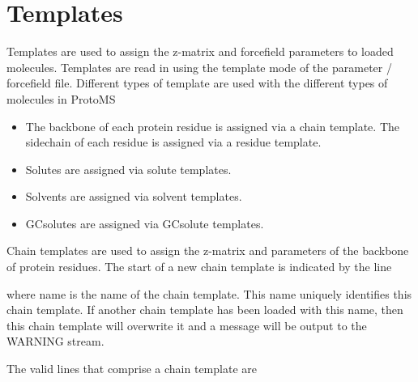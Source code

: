 \documentclass[letterpaper,10pt,english]{sphinxmanual}
\begin{document}
\section{Templates}
\label{\detokenize{protoms:templates}}\label{\detokenize{protoms:temref}}
Templates are used to assign the z-matrix and forcefield parameters to loaded molecules. Templates are read in using the template mode of the parameter / forcefield file. Different types of template are used with the different types of molecules in ProtoMS
\begin{itemize}
\item {} 
 The backbone of each protein residue is assigned via a chain template. The sidechain of each residue is assigned via a residue template.

\item {} 
 Solutes are assigned via solute templates.

\item {} 
 Solvents are assigned via solvent templates.

\item {} 
 GCsolutes are assigned via GCsolute templates.

\end{itemize}


Chain templates are used to assign the z-matrix and parameters of the backbone of protein residues. The start of a new chain template is indicated by the line

%
\begin{sphinxVerbatim}[commandchars=\\\{\}]
 
\end{sphinxVerbatim}

where name is the name of the chain template. This name uniquely identifies this chain template. If another chain template has been loaded with this name, then this chain template will overwrite it and a message will be output to the WARNING stream.

The valid lines that comprise a chain template are

%
\begin{sphinxVerbatim}[commandchars=\\\{\}]
    
\end{sphinxVerbatim}
\end{document}
